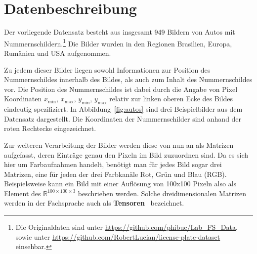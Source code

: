\section{Datenbeschreibung}
\label{sec:Datenbeschreibung}

Der vorliegende Datensatz besteht aus insgesamt 949 Bildern von Autos mit
Nummernschildern.\footnote{Die Originaldaten sind unter \url{https://github.com/phibuc/Lab_FS_Data},
    sowie unter \url{https://github.com/RobertLucian/license-plate-dataset}
    einsehbar.}
Die Bilder wurden in den Regionen Brasilien, Europa, Rum\"anien und USA
aufgenommen.

Zu jedem dieser Bilder liegen sowohl Informationen zur Position
des Nummernschildes innerhalb des Bildes, als auch zum
Inhalt des Nummernschildes vor.
Die Position des Nummernschildes ist dabei durch die Angabe von Pixel Koordinaten
$x_{\text{min}}$, $x_{\text{max}}$, $y_{\text{min}}$, $y_{\text{max}}$
relativ zur linken oberen Ecke des Bildes eindeutig spezifiziert.
In Abbildung~\ref{fig:autos} sind drei Beispielbilder aus dem Datensatz
dargestellt. Die Koordinaten der Nummernschilder sind anhand der
roten Rechtecke eingezeichnet.

Zur weiteren Verarbeitung der Bilder werden diese von nun an als Matrizen
aufgefasst, deren Eintr\"age genau den Pixeln im Bild zuzuordnen sind.
Da es sich hier um Farbaufnahmen handelt, ben\"otigt man f\"ur jedes
Bild sogar drei Matrizen, eine f\"ur jeden der drei Farbkan\"ale
Rot, Gr\"un und Blau (RGB).
Beispielsweise kann ein Bild mit einer Aufl\"osung von 100x100 Pixeln also
als Element des $\mathbb{R}^{100 \times 100 \times 3}$ beschrieben werden.
Solche \glqq dreidimensionalen Matrizen\grqq{} werden in der
Fachsprache auch als
\textbf{Tensoren}~\cite{Goodfellow-et-al-2016} bezeichnet.


